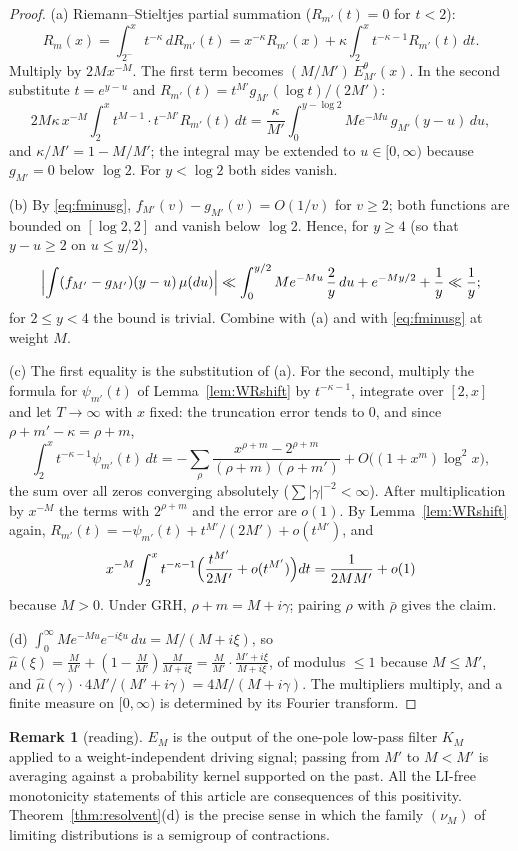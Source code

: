 \documentclass[11pt]{amsart}
\theoremstyle{definition}
\newtheorem{remark}[theorem]{Remark}
\numberwithin{equation}{section}
\newcommand{\Ein}{E^{\theta}}
\begin{document}
\begin{proof}
(a) Riemann--Stieltjes partial summation ($R_{m'}(t)=0$ for $t<2$):
\[
R_m(x)=\int_{2^-}^xt^{-\kappa}\,dR_{m'}(t)
=x^{-\kappa}R_{m'}(x)+\kappa\int_2^xt^{-\kappa-1}R_{m'}(t)\,dt .
\]
Multiply by $2Mx^{-M}$. The first term becomes
$(M/M')\,\Ein_{M'}(x)$. In the second substitute $t=e^{y-u}$ and
$R_{m'}(t)=t^{M'}g_{M'}(\log t)/(2M')$:
\[
2M\kappa\,x^{-M}\int_2^xt^{M-1}\cdot t^{-M'}R_{m'}(t)\,dt
=\frac{\kappa}{M'}\int_0^{y-\log2}Me^{-Mu}\,g_{M'}(y-u)\,du ,
\]
and $\kappa/M'=1-M/M'$; the integral may be extended to
$u\in[0,\infty)$ because $g_{M'}=0$ below $\log2$. For $y<\log2$
both sides vanish.

(b) By \eqref{eq:fminusg}, $f_{M'}(v)-g_{M'}(v)=O(1/v)$ for $v\ge2$;
both functions are bounded on $[\log2,2]$ and vanish below $\log2$.
Hence, for $y\ge4$ (so that $y-u\ge2$ on $u\le y/2$),
\[
\Bigl|\int(f_{M'}-g_{M'})(y-u)\,\mu(du)\Bigr|
\ll\int_0^{y/2}Me^{-Mu}\,\frac2y\,du+e^{-My/2}+\frac1y\ll\frac1y ;
\]
for $2\le y<4$ the bound is trivial. Combine with (a) and with
\eqref{eq:fminusg} at weight $M$.

(c) The first equality is the substitution of (a). For the second,
multiply the formula for $\psi_{m'}(t)$ of Lemma~\ref{lem:WRshift} by
$t^{-\kappa-1}$, integrate over $[2,x]$ and let $T\to\infty$ with $x$
fixed: the truncation error tends to $0$, and since
$\rho+m'-\kappa=\rho+m$,
\[
\int_2^xt^{-\kappa-1}\psi_{m'}(t)\,dt
=-\sum_\rho\frac{x^{\rho+m}-2^{\rho+m}}{(\rho+m)(\rho+m')}
+O\bigl((1+x^m)\log^2x\bigr),
\]
the sum over all zeros converging absolutely
($\sum|\gamma|^{-2}<\infty$). After multiplication by $x^{-M}$ the
terms with $2^{\rho+m}$ and the error are $o(1)$. By
Lemma~\ref{lem:WRshift} again,
$R_{m'}(t)=-\psi_{m'}(t)+t^{M'}/(2M')+o(t^{M'})$, and
\[
x^{-M}\int_2^xt^{-\kappa-1}\Bigl(\frac{t^{M'}}{2M'}+o(t^{M'})\Bigr)dt
=\frac1{2MM'}+o(1)
\]
because $M>0$. Under GRH, $\rho+m=M+i\gamma$; pairing $\rho$ with
$\bar\rho$ gives the claim.

(d) $\int_0^\infty Me^{-Mu}e^{-i\xi u}\,du=M/(M+i\xi)$, so
$\hat\mu(\xi)=\frac{M}{M'}+(1-\frac{M}{M'})\frac{M}{M+i\xi}
=\frac{M}{M'}\cdot\frac{M'+i\xi}{M+i\xi}$, of modulus $\le1$ because
$M\le M'$, and
$\hat\mu(\gamma)\cdot4M'/(M'+i\gamma)=4M/(M+i\gamma)$. The multipliers
multiply, and a finite measure on $[0,\infty)$ is determined by its
Fourier transform.
\end{proof}

\begin{remark}[reading]\label{rem:reading}
$E_M$ is the output of the one-pole low-pass filter $K_M$ applied to
a weight-independent driving signal; passing from $M'$ to $M<M'$ is
averaging against a probability kernel supported on the past. All
the LI-free monotonicity statements of this article are consequences
of this positivity. Theorem~\ref{thm:resolvent}(d) is the precise
sense in which the family $(\nu_M)$ of limiting distributions is a
semigroup of contractions.
\end{remark}
\end{document}
